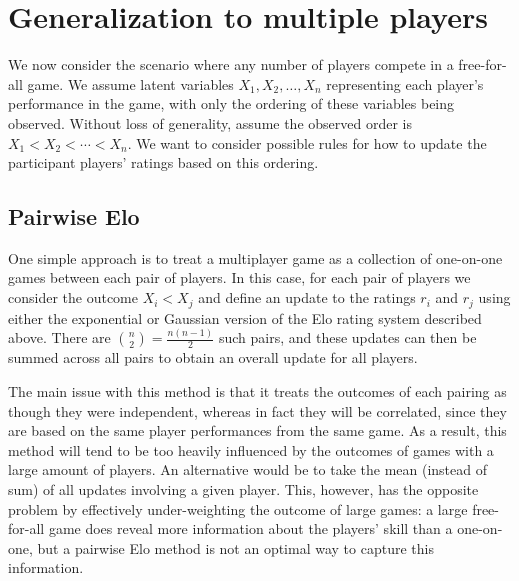 \documentclass{article}
\begin{document}
	\section{Generalization to multiple players}
	We now consider the scenario where any number of players compete in a free-for-all game. We assume latent variables
	$X_1, X_2, \dots, X_n$ representing each player's performance in the game, with only the ordering of these variables
	being observed. Without loss of generality, assume the observed order is $X_1 < X_2 < \cdots < X_n$. We want to consider
	possible rules for how to update the participant players' ratings based on this ordering.
	
	\subsection{Pairwise Elo}
	One simple approach is to treat a multiplayer game as a collection of one-on-one games between each pair of players.
	In this case, for each pair of players we consider the outcome $X_i < X_j$ and define an update to the ratings $r_i$ and $r_j$
	using either the exponential or Gaussian version of the Elo rating system described above. There are $\binom{n}2 = \frac{n(n-1)}2$
	such pairs, and these updates can then be summed across all pairs to obtain an overall update for all players.
	
	The main issue with this method is that it treats the outcomes of each pairing as though they were independent, whereas
	in fact they will be correlated, since they are based on the same player performances from the same game. As a result,
	this method will tend to be too heavily influenced by the outcomes of games with a large amount of players.
	An alternative would be to take the mean (instead of sum) of all updates involving a given player. This, however, has the opposite 
	problem by effectively under-weighting the outcome of large games: a large free-for-all game does reveal more information about
	the players' skill than a one-on-one, but a pairwise Elo method is not an optimal way to capture this information.
	
\end{document}
